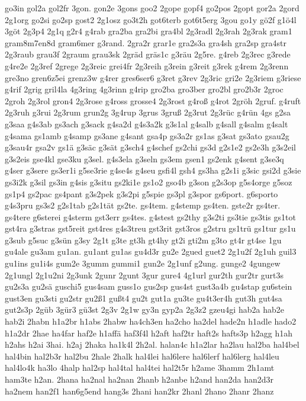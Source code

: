 {go3in
gol2a
gol2fr
3gon.
gon2e
3gons
goo2
2gope
gopf4
go2pos
2gopt
gor2a
2gord
2g1org
go2si
go2sp
gost2
2g1osz
go3t2h
got6terb
got6t5erg
3gou
go1y
gö2f
g1ö4l
3göt
2g3p4
2g1q
g2r4
g4rab
gra2ba
gra2bi
gra4bl
2g3radl
2g3rah
2g3rak
gram1
gram8m7en8d
gram6mer
g3rand.
2gra2r
grar1e
gra2s3a
gra4sh
gra2sp
gra4str
2g3raub
grau3f
2graum
grau3sk
2gräd
gräs1c
g3räu
2g5re.
g4reb
2g3rec
g3rede
g4re2e
2g3ref
2grege
2g3reic
grei4fr
2g3reih
g3rein
g3reit
g3rek
g4rem
2g3renn
gre3no
gren6z5ei
grenz3w
g4rer
gres6ser6
g3ret
g3rev
2g3ric
gri2e
2g3riem
g3riese
g4rif
2grig
gril4la
4g3ring
4g3rinn
g4rip
gro2ba
gro3ber
gro2bl
gro2b3r
2groc
2groh
2g3rol
gron4
2g3rose
g4ross
grosse4
2g3rost
g4roß
g4rot
2gröh
2gruf.
g4ruft
2g3ruh
g3rui
2g3rum
grun2g
3g4rup
3grus
3gruß
2g3rut
2g3rüc
g4rün
4gs
g2sa
g3saa
g4s3ab
gs3ach
g3sack
g4sa2d
g4s3a2k
g3s1al
g4salb
g4sall
g4salm
g4salt
g4sama
gs1amb
g4samp
gs3ane
g4sant
gsa4p
gs3a2r
gs1as
g3sat
gs3ato
gsau2g
g3sau4r
gsa2v
gs1ä
g3säc
g3sät
g3sch4
g4schef
gs2chi
gs3d
g2s1e2
gs2e3h
g3s2eil
g3s2eis
gse4kl
gse3ku
g3sel.
g4s3ela
g3seln
gs3em
gsen1
gs2enk
g4sent
g3se3q
g4ser
g3sere
gs3er1i
g5se3rie
g4se4s
g4seu
gsfi4l
gsh4
gs3ha
g2s1i
g3sic
gsi2d
g3sie
gs3i2k
g3sil
gs3in
g4sis
g3situ
gs2ki1e
gs1o2
gso4b
g3son
g2s3op
g5s4orge
g5soz
gs1p4
gs2pac
gs4pant
g3s2pek
g3s2pi
g5spie
gs3pl
g3spor
gs6port.
g6sporto
g4s3pru
gs3s2
g2s1tab
g2s1tät
gs2te.
gs4tem.
g4stemp
gs4ten.
gste2r
gs4ter.
gs4tere
g6sterei
g4sterm
gst3err
gs4tes.
g4stest
gs2thy
g3s2ti
gs3tie
gs3tis
gs1tot
gst4ra
g3stras
gst5reit
gst4res
g4s3treu
gst3rit
gst3ros
g2stru
gs1trü
gs1tur
gs1u
g3sub
g5suc
g3sün
g3sy
2g1t
g3te
gt3h
gt4hy
gt2i
gti2m
g3to
gt4r
gt4se
1gu
gu4ale
gu3am
gu1an.
gu1ant
gu1as
gu4d3r
gu2e
2gued
guet2
2g1u2f
2g1uh
guil3
gu1ins
gu1i4s
gum2e
3gumm
gummi1
gun2e
2g1unf
g2ung.
gunge2
4gungew
2g1ungl
2g1u2ni
2g3unk
2gunr
2gunt
3gur
gure4
4g1url
gur2th
gur2tr
gurt3s
gu2s3a
gu2sä
guschi5
gus4sam
guss1o
gus2sp
gus4st
gust3a4b
gu4stap
gu6stein
gust3en
gu3sti
gu2str
gu2ß1
gußt4
gu2t
gut1a
gu3te
gu4t3er4h
gut3h
gut4sa
gut2s3p
2güb
3gür3
gü3st
2g3v
2g1w
gy3n
gyp2a
2g3z2
gzeu4gi
hab2a
hab2e
hab2i
2habn
h1a2br
h1abs
2habw
ha4ch3en
ha2cho
ha2del
hade2n
h1adle
hado2
h1a2dr
2hae
ha4far
haf2e
h1affä
haf3f4l
h2aft
haf2tr
haft2s
hafts3p
h2agg
h1ah
h2ahs
h2ai
3hai.
h2aj
2haka
ha1k4l
2h2al.
halan4c
h1a2lar
ha2lau
hal2ba
hal4bel
hal4bin
hal2b3r
hal2bu
2hale
2halk
hal4lei
hal6lere
hal6lerf
hal6lerg
hal4leu
hal4lo4k
ha3lo
4halp
hal2sp
hal4tal
hal4tei
hal2t5r
h2ame
3hamm
2h1amt
ham3te
h2an.
2hana
ha2nal
ha2nan
2hanb
h2anbe
h2and
han2da
han2d3r
ha2nem
han2f1
han6g5end
hang3s
2hani
han2kr
2hanl
2hano
2hanr
2hanz
}
